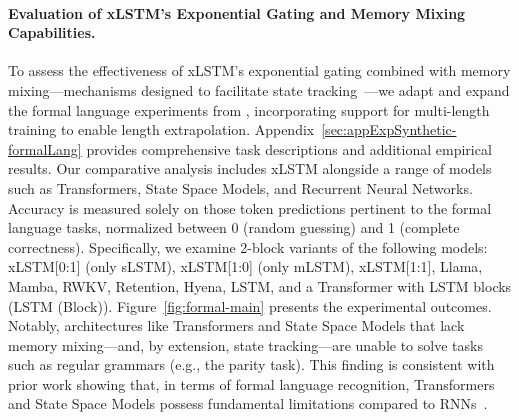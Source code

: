 \paragraph{Evaluation of xLSTM's Exponential Gating and Memory Mixing Capabilities.} To assess the effectiveness of xLSTM's exponential gating combined with memory mixing—mechanisms designed to facilitate state tracking~\citep{Merrill:24, Merrill:23}—we adapt and expand the formal language experiments from \citet{Deletang:23}, incorporating support for multi-length training to enable length extrapolation. Appendix~\ref{sec:appExpSynthetic-formalLang} provides comprehensive task descriptions and additional empirical results. Our comparative analysis includes xLSTM alongside a range of models such as Transformers, State Space Models, and Recurrent Neural Networks. Accuracy is measured solely on those token predictions pertinent to the formal language tasks, normalized between 0 (random guessing) and 1 (complete correctness). Specifically, we examine 2-block variants of the following models: xLSTM[0:1] (only sLSTM), xLSTM[1:0] (only mLSTM), xLSTM[1:1], Llama, Mamba, RWKV, Retention, Hyena, LSTM, and a Transformer with LSTM blocks (LSTM (Block)). Figure~\ref{fig:formal-main} presents the experimental outcomes. Notably, architectures like Transformers and State Space Models that lack memory mixing—and, by extension, state tracking—are unable to solve tasks such as regular grammars (e.g., the parity task). This finding is consistent with prior work showing that, in terms of formal language recognition, Transformers and State Space Models possess fundamental limitations compared to RNNs~\citep{Merrill:24, Merrill:23, Deletang:23}.

